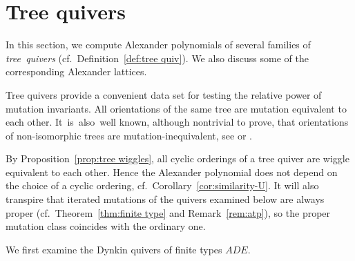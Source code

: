 \documentclass[11pt, letterpaper]{amsart}
\theoremstyle{definition}
\numberwithin{equation}{section}
\begin{document}
\section{Tree quivers}
\label{sec:tree-quivers}

In this section, we compute Alexander polynomials 
of several families of \hbox{\emph{tree quivers}}
(cf.\ Definition~\ref{def:tree quiv}). 
We also discuss some of the corresponding Alexander lattices. 

Tree quivers provide a convenient data set for testing the relative power of mutation invariants. 
All orientations of the same tree are mutation equivalent to each other. 
It~is~also~well known, although nontrivial to prove, that orientations of non-isomorphic trees
are mutation-inequivalent, see \cite{CK} or \cite[Corollary~2.6.13]{fwz1-3}. 

By Proposition~\ref{prop:tree wiggles}, all cyclic orderings of a tree quiver are wiggle equivalent to each other.
Hence the Alexander polynomial does not depend 
on the choice of a cyclic ordering, cf.\ Corollary~\ref{cor:similarity-U}. 
It will also transpire that iterated mutations
of the quivers examined below are always proper (cf.\ Theorem~\ref{thm:finite type} and Remark~\ref{rem:atp}), 
so the proper mutation class coincides with the ordinary one. 

We first examine the Dynkin quivers of finite types $ADE$. 
\end{document}
